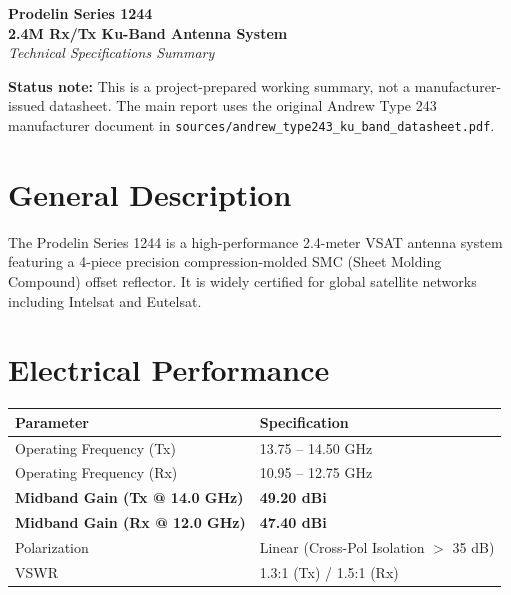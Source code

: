 \documentclass[a4paper,11pt]{article}
\begin{document}
\begin{center}
    \Huge \textbf{Prodelin Series 1244} \\[0.2cm]
    \Large \textbf{2.4M Rx/Tx Ku-Band Antenna System} \\[0.5cm]
    \large \textit{Technical Specifications Summary}
\end{center}

\vspace{0.5cm}
\textbf{Status note:} This is a project-prepared working summary, not a manufacturer-issued datasheet. The main report uses the original Andrew Type 243 manufacturer document in \texttt{sources/andrew\_type243\_ku\_band\_datasheet.pdf}.

\section*{General Description}
The Prodelin Series 1244 is a high-performance 2.4-meter VSAT antenna system featuring a 4-piece precision compression-molded SMC (Sheet Molding Compound) offset reflector. It is widely certified for global satellite networks including Intelsat and Eutelsat.

\section*{Electrical Performance}
\begin{table}[h!]
    \centering
    \begin{tabular}{@{}ll@{}}
        \toprule
        \textbf{Parameter} & \textbf{Specification} \\
        \midrule
        Operating Frequency (Tx) & 13.75 -- 14.50 GHz \\
        Operating Frequency (Rx) & 10.95 -- 12.75 GHz \\
        \textbf{Midband Gain (Tx @ 14.0 GHz)} & \textbf{49.20 dBi} \\
        \textbf{Midband Gain (Rx @ 12.0 GHz)} & \textbf{47.40 dBi} \\
        Polarization & Linear (Cross-Pol Isolation $>$ 35 dB) \\
        VSWR & 1.3:1 (Tx) / 1.5:1 (Rx) \\
        \bottomrule
    \end{tabular}
\end{table}
\end{document}
